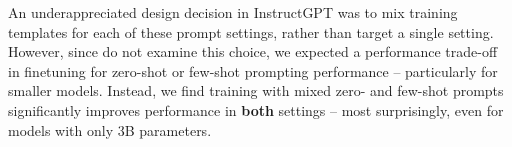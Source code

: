 An underappreciated design decision in InstructGPT \citep{ouyang2022training} was to mix training templates for each of these prompt settings, rather than target a single setting.
However, since \citet{ouyang2022training} do not examine this choice, we expected a performance trade-off in finetuning for zero-shot or few-shot prompting performance -- particularly for smaller models.
Instead, we find training with mixed zero- and few-shot prompts significantly improves performance in \textbf{both} settings -- most surprisingly, even for models with only 3B parameters.

\makeatletter
\newenvironment{customlegend2}[1][]{%
    \begingroup
    \pgfplots@init@cleared@structures
    \pgfplotsset{#1}%
}{%
    \pgfplots@createlegend
    \endgroup
}%

\def\addlegendimage{\csname pgfplots@addlegendimage\endcsname}

